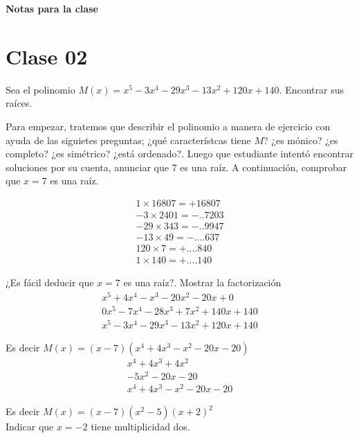 \documentclass[12pt]{article}
\begin{document}
    \begin{center}
        \textbf{\Large Notas para la clase}
    \end{center}

    \section{Clase 02}
    {
        Sea el polinomio $M(x) = x^5 - 3x^4 - 29x^3 - 13x^2 + 120x + 140.$ Encontrar sus raíces.

        Para empezar, tratemos que describir el polinomio a manera de ejercicio con ayuda de las siguietes preguntas; ¿qué característcas tiene $M$? ¿es mónico? ¿es completo? ¿es simétrico? ¿está ordenado?.
        Luego que estudiante intentó encontrar soluciones por su cuenta, anunciar que 7 es una raíz. A continuación, comprobar que $x = 7$ es una raíz.

        \begin{align*}
              1\times 16807= +16807\\
             -3\times 2401 = -\mbox{..}7203\\
            -29\times 343  = -\mbox{..}9947\\
            -13\times 49   = -\mbox{....}637\\
            120\times 7    = +\mbox{....}840\\
              1\times 140  = +\mbox{....}140
            \end{align*}

        ¿Es fácil deducir que $x = 7$ es una raíz?. Mostrar la factorización
        \begin{align*}
            x^5 + 4x^4 - x^3 - 20x^2 - 20x + 0 \\
            0x^5 - 7x^4 - 28x^3 + 7x^2 + 140x + 140\\
            x^5 - 3x^4 - 29x^3 - 13x^2 + 120x + 140
        \end{align*}

        Es decir $M(x) = (x - 7)(x^4 + 4x^3 - x^2 - 20x - 20)$
        \begin{align*}
            x^4 + 4x^3 + 4x^2 \\
            -5x^2 - 20x - 20\\
            x^4 + 4x^3 - x^2 - 20x - 20
        \end{align*}

        Es decir $M(x) = (x - 7)(x^2 - 5)(x + 2)^2$\\
        Indicar que $x = -2$ tiene multiplicidad dos.
    }\label{sec:clase-02}
\end{document}
